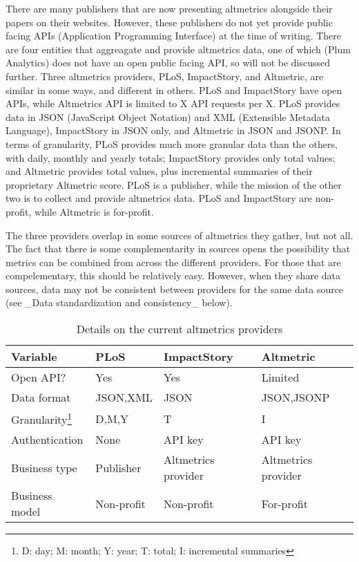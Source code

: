 \documentclass[letterpaper,superscriptaddress,showkeys,longbibliography]{revtex4-1}\usepackage{graphicx, color}
\begin{document}
There are many publishers that are now presenting altmetrics alongside their papers on their websites. However, these publishers do not yet provide public facing APIs (Application Programming Interface) at the time of writing. There are four entities that aggreagate and provide altmetrics data, one of which (Plum Analytics) does not have an open public facing API, so will not be discussed further.  Three altmetrics providers, PLoS, ImpactStory, and Altmetric, are similar in some ways, and different in others. PLoS and ImpactStory have open APIs, while Altmetrics API is limited to X API requests per X. PLoS provides data in JSON (JavaScript Object Notation) and XML (Extensible Metadata Language), ImpactStory in JSON only, and Altmetric in JSON and JSONP. In terms of granularity, PLoS provides much more granular data than the others, with daily, monthly and yearly totals; ImpactStory provides only total values; and Altmetric provides total values, plus incremental summaries of their proprietary Altmetric score. PLoS is a publisher, while the mission of the other two is to collect and provide altmetrics data. PLoS and ImpactStory are non-profit, while Altmetric is for-profit.

The three providers overlap in some sources of altmetrics they gather, but not all. The fact that there is some complementarity in sources opens the possibility that metrics can be combined from across the different providers. For those that are compelementary, this should be relatively easy. However, when they share data sources, data may not be consistent between providers for the same data source (see _Data standardization and consistency_ below).


\begin{table}[!ht]
\caption{Details on the current altmetrics providers}\label{tab:a} %
\begin{tabular}{|l|l|l|l|}
\hline
Variable & PLoS & ImpactStory & Altmetric  \\
\hline
Open API? & Yes & Yes & Limited \\
Data format & JSON,XML & JSON & JSON,JSONP \\
Granularity\footnote{D: day; M: month; Y: year; T: total; I: incremental summaries} & D,M,Y & T & I \\
Authentication & None & API key & API key \\
Business type & Publisher & Altmetrics provider & Altmetrics provider \\
Business model & Non-profit & Non-profit & For-profit \\
\hline
\end{tabular}
\end{table}
\end{document}

